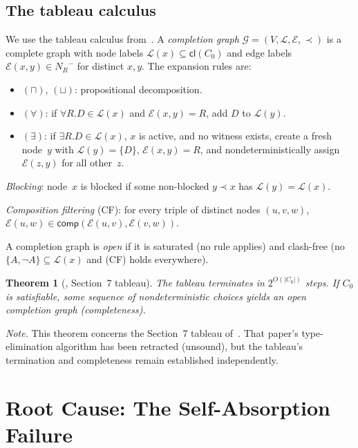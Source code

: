 \documentclass[a4paper,11pt]{article}
\newtheorem{theorem}{Theorem}[section]
\theoremstyle{definition}
\newcommand{\NR}{\ensuremath{N_R}}
\newcommand{\comp}{\ensuremath{\mathsf{comp}}}
\newcommand{\cl}{\ensuremath{\mathsf{cl}}}
\begin{document}
\subsection{The tableau calculus}
\label{sec:tableau}

We use the tableau calculus from~\cite[Section~7]{CompanionPaper}.
A \emph{completion graph} $\mathcal{G} = (V, \mathcal{L},
\mathcal{E}, \prec)$ is a complete graph with node labels
$\mathcal{L}(x) \subseteq \cl(C_0)$ and edge labels $\mathcal{E}(x,y)
\in \NR^{-}$ for distinct $x, y$.  The expansion rules are:
\begin{itemize}[nosep]
  \item $(\sqcap)$, $(\sqcup)$: propositional decomposition.
  \item $(\forall)$: if $\forall R.D \in \mathcal{L}(x)$ and
    $\mathcal{E}(x,y) = R$, add $D$ to $\mathcal{L}(y)$.
  \item $(\exists)$: if $\exists R.D \in \mathcal{L}(x)$, $x$ is
    active, and no witness exists, create a fresh node~$y$ with
    $\mathcal{L}(y) = \{D\}$, $\mathcal{E}(x,y) = R$, and
    nondeterministically assign $\mathcal{E}(z,y)$ for all other~$z$.
\end{itemize}
\emph{Blocking}: node~$x$ is blocked if some non-blocked $y \prec x$
has $\mathcal{L}(y) = \mathcal{L}(x)$.

\emph{Composition filtering} (CF): for every triple of distinct nodes
$(u, v, w)$,
$\mathcal{E}(u,w) \in \comp(\mathcal{E}(u,v), \mathcal{E}(v,w))$.

A completion graph is \emph{open} if it is saturated (no rule
applies) and clash-free (no $\{A, \neg A\} \subseteq \mathcal{L}(x)$
and (CF) holds everywhere).

\begin{theorem}[\cite{CompanionPaper}, Section~7 tableau]
\label{thm:term-complete}
The tableau terminates in $2^{O(|C_0|)}$ steps.  If $C_0$ is
satisfiable, some sequence of nondeterministic choices yields an open
completion graph \textup{(}completeness\textup{)}.
\end{theorem}

\noindent\textit{Note.}\; This theorem concerns the Section~7 tableau
of~\cite{CompanionPaper}.  That paper's type-elimination algorithm
has been retracted (unsound), but the tableau's termination and
completeness remain established independently.


\section{Root Cause: The Self-Absorption Failure}
\label{sec:root-cause}
\end{document}
